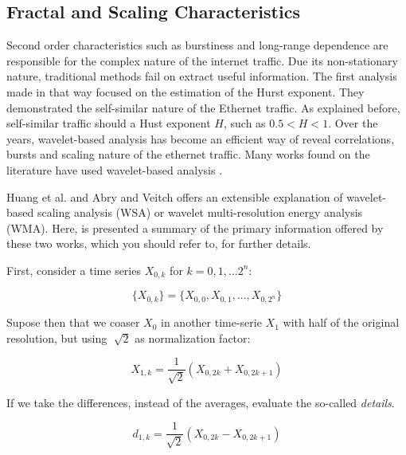 \subsection{Fractal and Scaling Characteristics}

Second order characteristics such as burstiness and long-range dependence are responsible for the complex nature of the internet traffic\cite{validate-trafficgen}. Due its non-stationary nature, traditional methods fail on extract useful information\cite{validate-trafficgen}. The first analysis made in that way focused on the estimation of the Hurst exponent\cite{selfsimilar-ethernet}. They demonstrated the self-similar nature of the Ethernet traffic. As explained before, self-similar traffic should a Hust exponent $H$, such as $ 0.5 < H < 1$. Over the years, wavelet-based analysis has become an efficient way of reveal correlations, bursts and scaling nature of the ethernet traffic\cite{validate-trafficgen}. Many works found on the literature have used wavelet-based analysis \cite{swing-paper}\cite{non-intrusive-wavelet}\cite{wavelet-analysis-long-range}. 

Huang et al. \cite{non-intrusive-wavelet} and Abry and Veitch \cite{wavelet-analysis-long-range} offers an extensible explanation of wavelet-based scaling analysis (WSA) or wavelet multi-resolution energy analysis (WMA). Here, is presented a summary of the primary information offered by these two works, which you should refer to, for further details. 

First, consider a time series $X_{0,k}$ for $k = 0, 1, ... 2^n$:

\begin{equation}
\{X_{0,k}\} = \{ X_{0,0}, X_{0,1}, ... ,X_{0,2^{n}} \}
\end{equation} 

Supose then that we coaser $X_{0}$ in another time-serie $X_{1}$ with half of the original resolution, but using  $ \sqrt[]{2} $  as normalization factor:

\begin{equation}
X_{1,k} = \frac{1}{\sqrt{2}}(X_{0,2k} + X_{0,2k+1})
\end{equation}

If we take the differences, instead of the averages, evaluate the so-called \textit{details}. 

\begin{equation}
d_{1,k} = \frac{1}{\sqrt{2}}(X_{0,2k} - X_{0,2k+1})
\end{equation}

